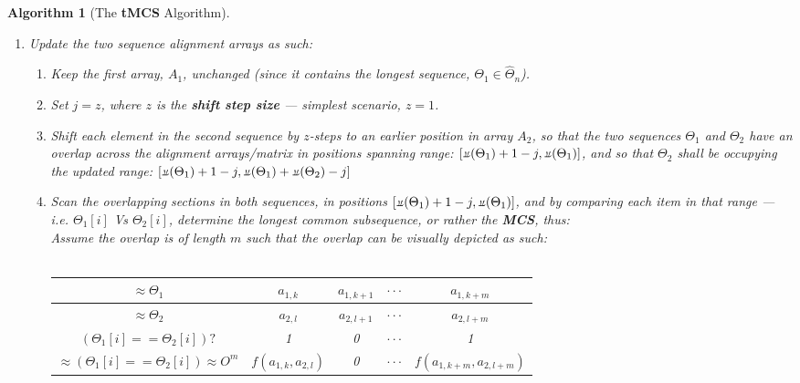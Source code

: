 \documentclass[a4paper, 18pt]{book} %
\newtheorem{alg}{Algorithm}
\newcommand{\invpi}{\rotatebox[origin=c]{180}{$\pi$}}
\begin{document}
\begin{alg}[The \textbf{tMCS} Algorithm]
\begin{enumerate}
{Visually, we can express this as:\\\\

\begin{tabular}[H]{|c||c|c|c|c|c|c|c|c|c|c|}
\hline
$A_1$ & $a_{1,1}$ & $a_{1,2}$ & $\cdot\cdot\cdot$ & $a_{1,\invpi(\Theta_1)}$ & & & & & & \\
\hline
$A_2$ & & & & & $a_{2,1}$ & $a_{2,2}$ & $\cdot\cdot\cdot$ & $a_{2,\invpi(\Theta_1)}$ & & \\
\hline
 
\end{tabular}\\\\


}
\item{
Update the two sequence alignment arrays as such:
\begin{enumerate}
\item{
Keep the first array, $A_1$, unchanged (since it contains the longest sequence, $\Theta_1 \in \hat{\Theta}_n$).
}
\item Set $j = z$, where $z$ is the \textbf{shift step size} --- simplest scenario, $z = 1$.
\item {Shift each element in the second sequence by $z$-steps to an earlier position in array $A_2$, so that the two sequences $\Theta_1$ and $\Theta_2$ have an overlap across the alignment arrays/matrix in positions spanning range: $[\invpi(\Theta_1)+1-j, \invpi(\Theta_1)]$, and so that $\Theta_2$ shall be occupying the updated range: $[\invpi(\Theta_1)+1 - j, \invpi(\Theta_1)+\invpi(\Theta_2) - j]$}
\item {
Scan the overlapping sections in both sequences, in positions  $[\invpi(\Theta_1)+1-j, \invpi(\Theta_1)]$, and by comparing each item in that range --- i.e. $\Theta_1[i]$ Vs $\Theta_2[i]$, determine the longest common subsequence, or rather the \textbf{MCS}, thus:\\

Assume the overlap is of length $m$ such that the overlap can be visually depicted as such:\\\\

\begin{tabular}[H]{|c||c|c|c|c|}
\hline
$\approx \Theta_1$ & $a_{1,k}$ & $a_{1,k+1}$ & $\cdot\cdot\cdot$ & $a_{1,k+m}$\\
\hline
$\approx \Theta_2$ & $a_{2,l}$ & $a_{2,l+1}$ & $\cdot\cdot\cdot$ & $a_{2,l+m}$\\
\hline
$(\Theta_1[i] == \Theta_2[i])?$ & 1 & 0 &  $\cdot\cdot\cdot$ & 1\\
\hline
$\approx (\Theta_1[i] == \Theta_2[i]) \approx O^m$ & $f(a_{1,k},a_{2,l})$ & 0 &  $\cdot\cdot\cdot$ & $f(a_{1,k+m},a_{2,l+m})$ \\
\hline
 \end{tabular}\\\\
 
}
\end{enumerate}}
\end{enumerate}
\end{alg}
\end{document}
